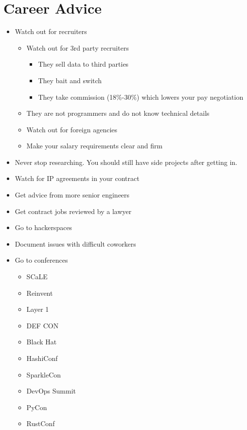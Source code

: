 \documentclass[12pt]{article}
\begin{document}
\section{Career Advice}
\begin{itemize}
\item Watch out for recruiters
  \begin{itemize}
  \item Watch out for 3rd party recruiters
    \begin{itemize}
    \item They sell data to third parties
    \item They bait and switch
    \item They take commission (18\%-30\%) which lowers your pay negotiation
    \end{itemize}
  \item They are not programmers and do not know technical details
  \item Watch out for foreign agencies
  \item Make your salary requirements clear and firm
  \end{itemize}
\item Never stop researching. You should still have side projects after getting in.
\item Watch for IP agreements in your contract
\item Get advice from more senior engineers
\item Get contract jobs reviewed by a lawyer
\item Go to hackerspaces
\item Document issues with difficult coworkers
\item Go to conferences
  \begin{itemize}
  \item SCaLE
  \item Reinvent
  \item Layer 1
  \item DEF CON
  \item Black Hat
  \item HashiConf
  \item SparkleCon
  \item DevOps Summit
  \item PyCon
  \item RustConf
  \end{itemize}
\end{itemize}
\end{document}
